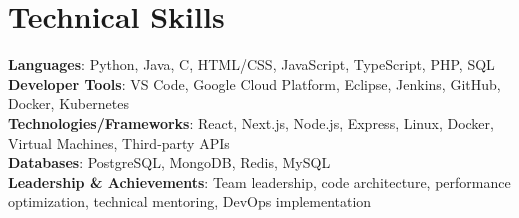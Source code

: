 \documentclass[letterpaper,11pt]{article}
\begin{document}
\section{Technical Skills}
 \begin{itemize}[leftmargin=0.15in, label={}]
    \small{\item{
     \textbf{Languages}{: Python, Java, C, HTML/CSS, JavaScript, TypeScript, PHP, SQL} \\
     \textbf{Developer Tools}{: VS Code, Google Cloud Platform, Eclipse, Jenkins, GitHub, Docker, Kubernetes} \\
     \textbf{Technologies/Frameworks}{: React, Next.js, Node.js, Express, Linux, Docker, Virtual Machines, Third-party APIs} \\
     \textbf{Databases}{: PostgreSQL, MongoDB, Redis, MySQL} \\
     \textbf{Leadership \& Achievements}{: Team leadership, code architecture, performance optimization, technical mentoring, DevOps implementation} \\
    }}
 \end{itemize}
 \vspace{-16pt}
\end{document}
